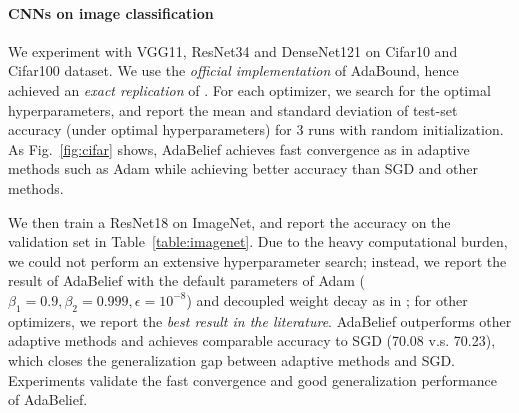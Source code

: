 \documentclass{article}
\begin{document}
\paragraph{CNNs on image classification}
We experiment with VGG11, ResNet34 and DenseNet121 on Cifar10 and Cifar100 dataset. We use the \textit{ official implementation} %
of AdaBound, hence achieved an \textit{exact replication} of \cite{luo2019adaptive}. For each optimizer, we search for the optimal hyperparameters, and report the mean and standard deviation of test-set accuracy (under optimal hyperparameters) for 3 runs with random initialization. As Fig.~\ref{fig:cifar} shows, AdaBelief achieves fast convergence as in adaptive methods such as Adam while achieving better accuracy than SGD and other methods.

We then train a ResNet18 on ImageNet, and report the accuracy on the validation set in Table~\ref{table:imagenet}. Due to the heavy computational burden, we could not perform an extensive hyperparameter search; instead, we report the result of AdaBelief with the default parameters of Adam ($\beta_1=0.9, \beta_2 =0.999, \epsilon=10^{-8}$) and decoupled weight decay as in \cite{liu2019variance, loshchilov2017decoupled}; for other optimizers, we report the \textit{best result in the literature}. AdaBelief outperforms other adaptive methods and achieves comparable accuracy to SGD (70.08 v.s. 70.23), which closes the generalization gap between adaptive methods and SGD. Experiments validate the fast convergence and good generalization performance of AdaBelief.
\end{document}
